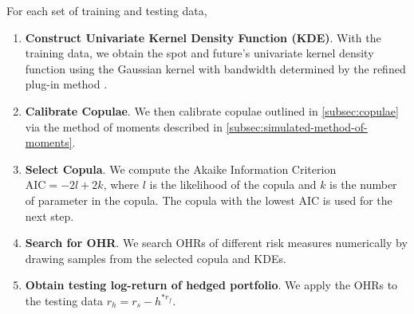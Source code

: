 For each set of training and testing data,

\begin{enumerate}
  \item \textbf{Construct Univariate Kernel Density Function (KDE)}.
  With the training data, we obtain the spot and future's univariate kernel density function using the Gaussian kernel
  with bandwidth determined by the refined plug-in method \citep[section 3.3.3]{hardle2004nonparametric}.
  \item \textbf{Calibrate Copulae}.
  We then calibrate copulae outlined in \ref{subsec:copulae} via the method of moments described in \ref{subsec:simulated-method-of-moments}.
  \item \textbf{Select Copula}.
  We compute the Akaike Information Criterion $\text{AIC}=-2l+2k$,
  where $l$ is the likelihood of the copula and $k$ is the number of parameter in the copula.
  The copula with the lowest AIC is used for the next step.
  \item \textbf{Search for OHR}.
  We search OHRs of different risk measures numerically by drawing samples from the selected copula and KDEs.
  \item \textbf{Obtain testing log-return of hedged portfolio}.
  We apply the OHRs to the testing data $r_h = r_s - h^{*r_f}$.
  \end{enumerate}





%

